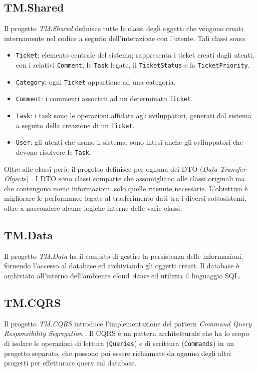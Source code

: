 \subsection{TM.Shared}
Il progetto \textit{TM.Shared} definisce tutte le classi degli oggetti che vengono creati internamente nel codice a seguito dell'interazione
con l'utente. Tali classi sono:
\begin{itemize}
    \item \texttt{Ticket}: elemento centrale del sistema; rappresenta i ticket creati dagli utenti, con i relativi \texttt{Comment},
        le \texttt{Task} legate, il \texttt{TicketStatus} e la \texttt{TicketPriority}.
    \item \texttt{Category}: ogni \texttt{Ticket} appartiene ad una categoria.
    \item \texttt{Comment}: i commenti associati ad un determinato \texttt{Ticket}.
    \item \texttt{Task}: i task sono le operazioni affidate agli sviluppatori, generati dal sistema a seguito della creazione
        di un \texttt{Ticket}.
    \item \texttt{User}: gli utenti che usano il sistema; sono intesi anche gli sviluppatori che devono risolvere le \texttt{Task}.
\end{itemize}
Oltre alle classi però, il progetto definisce per ognuna dei DTO (\textit{Data Transfer Objects}) \cite{microsoft_webapi_ef_part5}.
I DTO sono classi compatte che assomigliano alle classi originali ma che contengono meno informazioni, solo quelle ritenute necessarie. 
L'obiettivo è migliorare le performance legate al trasferimento dati tra i diversi sottosistemi, oltre a nascondere alcune logiche interne delle varie classi.

\subsection{TM.Data}
Il progetto \textit{TM.Data} ha il compito di gestire la persistenza delle informazioni, fornendo l'accesso al database
ed archiviando gli oggetti creati. Il database è archiviato all'interno dell'ambiente cloud \textit{Azure} ed utilizza il linguaggio SQL.

\subsection{TM.CQRS}
Il progetto \textit{TM.CQRS} introduce l'implementazione del pattern \textit{Command Query Responsibility Segregation} \cite{azure_cqrs_msdocs}.
Il CQRS è un pattern architetturale che ha lo scopo di isolare le operazioni di lettura (\texttt{Queries}) e di scrittura (\texttt{Commands})
in un progetto separato, che possono poi essere richiamate da ognuno degli altri progetti per effetturare query sul database.

